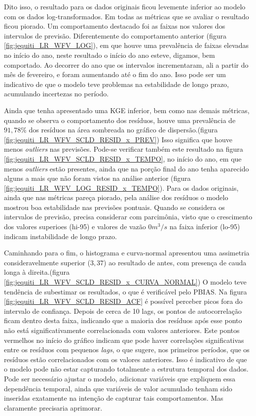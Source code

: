 Dito isso, o resultado para os dados originais ficou levemente inferior ao modelo com os dados log-transformados. Em todas as métricas que se avaliar o resultado ficou piorado. Um comportamento destacado foi as faixas nos valores dos intervalos de previsão. Diferentemente do comportamento anterior (figura \ref{fig:jequiti_LR_WFV_LOG}), em que houve uma prevalência de faixas elevadas no início do ano, neste resultado o início do ano esteve, digamos, bem comportado. Ao decorrer do ano que os intervalos incrementaram, ali a partir do mês de fevereiro, e foram aumentando até o fim do ano. Isso pode ser um indicativo de que o modelo teve problemas na estabilidade de longo prazo, acumulando incertezas no período.

Ainda que tenha apresentado uma KGE inferior, bem como nas demais métricas, quando se observa o comportamento dos resíduos, houve uma prevalência de $91,78\%$ dos resíduos na área sombreada no gráfico de dispersão.(figura \ref{fig:jequiti_LR_WFV_SCLD_RESID_x_PREV}) Isso significa que houve menos \textit{outliers} nas previsões. Pode-se verificar também este resultado na figura \ref{fig:jequiti_LR_WFV_SCLD_RESID_x_TEMPO}, no início do ano, em que menos \textit{outliers} estão presentes, ainda que na porção final do ano tenha aparecido alguns a mais que não foram vistos na análise anterior (figura \ref{fig:jequiti_LR_WFV_LOG_RESID_x_TEMPO}). Para os dados originais, ainda que nas métricas pareça piorado, pela análise dos resíduos o modelo mostrou boa estabilidade nas previsões pontuais. Quando se considera os intervalos de previsão, precisa considerar com parcimônia, visto que o crescimento dos valores superioes (hi-95) e valores de vazão $0 m^3/s$ na faixa inferior (lo-95) indicam instabilidade de longo prazo.


Caminhando para o fim, o histograma e curva-normal apresentou uma assimetria consideravelmente superior ($3,37$) ao resultado de antes, com presença de cauda longa à direita.(figura \ref{fig:jequiti_LR_WFV_SCLD_RESID_x_CURVA_NORMAL}) O modelo teve tendência de subestimar os resultados, o que é verificável pelo PBIAS. Na figura \ref{fig:jequiti_LR_WFV_SCLD_RESID_ACF} é possível perceber picos fora do intervalo de confiança. Depois de cerca de 10 lags, os pontos de autocorrelação ficam dentro desta faixa, indicando que a maioria dos resíduos após esse ponto não está significativamente correlacionada com valores anteriores. Este pontos vermelhos no início do gráfico indicam que pode haver correlações significativas entre os resíduos com pequenos \textit{lags}, o que sugere, nos primeiros períodos, que os resíduos estão correlacionados com os valores anteriores. Isso é indicativo de que o modelo pode não estar capturando totalmente a estrutura temporal dos dados. Pode ser necessário ajustar o modelo, adicionar variáveis que expliquem essa dependência temporal, ainda que variáveis de valor acumulado tenham sido inseridas exatamente na intenção de capturar tais comportamentos. Mas claramente precisaria aprimorar.

